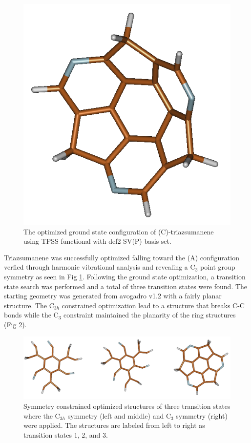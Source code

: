 \documentclass[11pt]{article}
\begin{document}
\begin{figure}[H]
  \centering
  \includegraphics[scale=0.25]{opt.png}
  \caption{The optimized ground state configuration of (C)-triazsumanene using TPSS
    functional with def2-SV(P) basis set.}
  \label{fig:optimized}
\end{figure}

Triazsumanene was successfully optimized falling toward the (A) configuration verfied
through harmonic vibrational analysis and revealing a C$_3$ point group symmetry as
seen in Fig \ref{fig:optimized}. Following the ground state optimization, a transition
state search was performed and a total of three transition states were found. The
starting geometry was generated from avogadro v1.2\cite{Hanwell2012} with a fairly
planar structure. The C$_{3h}$ constrained optimization lead to a structure that
breaks C-C bonds while the C$_3$ constraint maintained the planarity of the ring
structures (Fig \ref{fig:trans}). 

\begin{figure}[H]
  \center
  \includegraphics[scale=0.25]{transition_states.png}
  \caption{Symmetry constrained optimized structures of three transition states where
    the C$_{3h}$ symmetry (left and middle) and C$_3$ symmetry (right) were applied. The
    structures are labeled from left to right as transition states 1, 2, and 3.}
  \label{fig:trans}
\end{figure}
\end{document}
